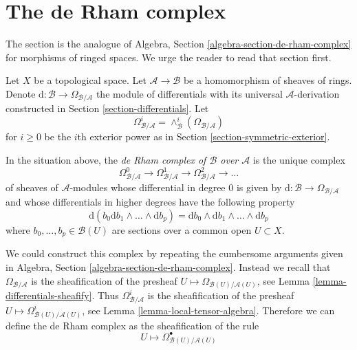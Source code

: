 \section{The de Rham complex}
\label{section-de-rham-complex}

\noindent
The section is the analogue of
Algebra, Section \ref{algebra-section-de-rham-complex} for morphisms of ringed
spaces. We urge the reader to read that section first.

\medskip\noindent
Let $X$ be a topological space. Let $\mathcal{A} \to \mathcal{B}$ be a
homomorphism of sheaves of rings. Denote
$\text{d} : \mathcal{B} \to \Omega_{\mathcal{B}/\mathcal{A}}$
the module of differentials with its universal $\mathcal{A}$-derivation
constructed in Section \ref{section-differentials}.
Let
$$
\Omega_{\mathcal{B}/\mathcal{A}}^i =
\wedge^i_\mathcal{B}(\Omega_{\mathcal{B}/\mathcal{A}})
$$
for $i \geq 0$ be the $i$th exterior power as in
Section \ref{section-symmetric-exterior}.

\begin{definition}
\label{definition-de-rham-complex}
In the situation above, the
{\it de Rham complex of $\mathcal{B}$ over $\mathcal{A}$}
is the unique complex
$$
\Omega_{\mathcal{B}/\mathcal{A}}^0 \to
\Omega_{\mathcal{B}/\mathcal{A}}^1 \to
\Omega_{\mathcal{B}/\mathcal{A}}^2 \to \ldots
$$
of sheaves of $\mathcal{A}$-modules whose differential in degree
$0$ is given by $\text{d} : \mathcal{B} \to \Omega_{\mathcal{B}/\mathcal{A}}$
and whose differentials in higher degrees have the following property
\begin{equation}
\label{equation-rule}
\text{d}\left(b_0\text{d}b_1 \wedge \ldots \wedge \text{d}b_p\right) =
\text{d}b_0 \wedge \text{d}b_1 \wedge \ldots \wedge \text{d}b_p
\end{equation}
where $b_0, \ldots, b_p \in \mathcal{B}(U)$ are sections over a common
open $U \subset X$.
\end{definition}

\noindent
We could construct this complex by repeating the cumbersome arguments
given in Algebra, Section \ref{algebra-section-de-rham-complex}.
Instead we recall that $\Omega_{\mathcal{B}/\mathcal{A}}$ is the
sheafification of the presheaf
$U \mapsto \Omega_{\mathcal{B}(U)/\mathcal{A}(U)}$, see
Lemma \ref{lemma-differentials-sheafify}.
Thus $\Omega_{\mathcal{B}/\mathcal{A}}^i$ is the sheafification of
the presheaf
$U \mapsto \Omega^i_{\mathcal{B}(U)/\mathcal{A}(U)}$, see
Lemma \ref{lemma-local-tensor-algebra}.
Therefore we can define the de Rham complex
as the sheafification of the rule
$$
U \longmapsto
\Omega^\bullet_{\mathcal{B}(U)/\mathcal{A}(U)}
$$

